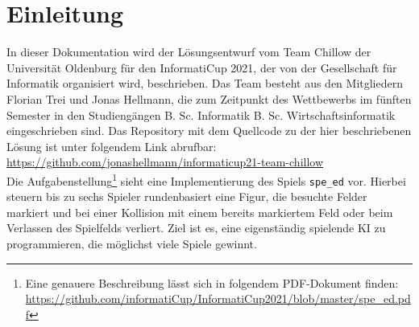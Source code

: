 \chapter{Einleitung}
\label{ch:einleitung}

In dieser Dokumentation wird der Lösungsentwurf vom Team Chillow der Universität Oldenburg für den InformatiCup 2021,
der von der Gesellschaft für Informatik organisiert wird, beschrieben.
Das Team besteht aus den Mitgliedern Florian Trei und Jonas Hellmann, die zum Zeitpunkt des Wettbewerbs im fünften
Semester in den Studiengängen B. Sc. Informatik \bzw B. Sc. Wirtschaftsinformatik eingeschrieben sind.
Das Repository mit dem Quellcode zu der hier beschriebenen Lösung ist unter folgendem Link abrufbar:
\url{https://github.com/jonashellmann/informaticup21-team-chillow} \\

Die Aufgabenstellung\footnote{Eine genauere Beschreibung lässt sich in folgendem PDF-Dokument finden:
\url{https://github.com/informatiCup/InformatiCup2021/blob/master/spe\_ed.pdf}} sieht eine Implementierung des Spiels
\texttt{spe\_ed} vor.
Hierbei steuern bis zu sechs Spieler rundenbasiert eine Figur, die besuchte Felder markiert und bei einer Kollision
mit einem bereits markiertem Feld oder beim Verlassen des Spielfelds verliert.
Ziel ist es, eine eigenständig spielende \ac{KI} zu programmieren, die möglichst viele Spiele gewinnt.